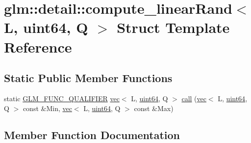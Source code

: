 \hypertarget{structglm_1_1detail_1_1compute__linear_rand_3_01_l_00_01uint64_00_01_q_01_4}{}\section{glm\+:\+:detail\+:\+:compute\+\_\+linear\+Rand$<$ L, uint64, Q $>$ Struct Template Reference}
\label{structglm_1_1detail_1_1compute__linear_rand_3_01_l_00_01uint64_00_01_q_01_4}
\subsection*{Static Public Member Functions}
\begin{DoxyCompactItemize}
\item 
static \hyperlink{setup_8hpp_a33fdea6f91c5f834105f7415e2a64407}{G\+L\+M\+\_\+\+F\+U\+N\+C\+\_\+\+Q\+U\+A\+L\+I\+F\+I\+ER} \hyperlink{structglm_1_1vec}{vec}$<$ L, \hyperlink{namespaceglm_1_1detail_adec4b19bf4982125e122db2fe03c5810}{uint64}, Q $>$ \hyperlink{structglm_1_1detail_1_1compute__linear_rand_3_01_l_00_01uint64_00_01_q_01_4_a802cbce0e4da77e16718ffb2657a821b}{call} (\hyperlink{structglm_1_1vec}{vec}$<$ L, \hyperlink{namespaceglm_1_1detail_adec4b19bf4982125e122db2fe03c5810}{uint64}, Q $>$ const \&Min, \hyperlink{structglm_1_1vec}{vec}$<$ L, \hyperlink{namespaceglm_1_1detail_adec4b19bf4982125e122db2fe03c5810}{uint64}, Q $>$ const \&Max)
\end{DoxyCompactItemize}


\subsection{Member Function Documentation}
\mbox{\label{structglm_1_1detail_1_1compute__linear_rand_3_01_l_00_01uint64_00_01_q_01_4_a802cbce0e4da77e16718ffb2657a821b}} 
